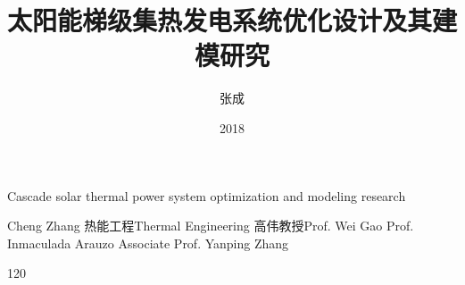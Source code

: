 \makenomenclature

\title{太阳能梯级集热发电系统优化设计\newline 及其建模研究}{Cascade solar thermal power system optimization and modeling research}
\author
{张成}{Cheng Zhang}
\major
{热能工程}{Thermal Engineering}
\supervisor
{高伟\hspace{0.2em}教授}{Prof. Wei Gao \newline Prof. Inmaculada Arauzo \newline Associate Prof. Yanping Zhang}
\date{2018}{1}{20}